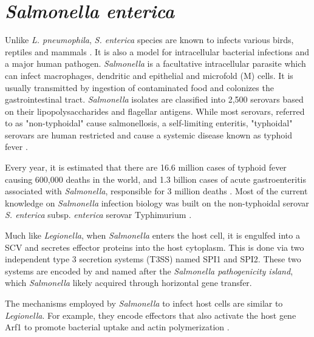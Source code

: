 \section{\textit{Salmonella enterica}}

Unlike \textit{L. pneumophila}, \textit{S. enterica} species are known to infects various birds, reptiles and mammals \cite{Uzzau2000}. It is also a model for intracellular bacterial infections and a major human pathogen. \textit{Salmonella} is a facultative intracellular parasite which can infect macrophages, dendritic and epithelial and microfold (M) cells. It is usually transmitted by ingestion of contaminated food and colonizes the gastrointestinal tract. \textit{Salmonella} isolates are classified into 2,500 serovars based on their lipopolysaccharides and flagellar antigens. While most serovars, referred to as "non-typhoidal" cause salmonellosis, a self-limiting enteritis, "typhoidal" serovars are human restricted and cause a systemic disease known as typhoid fever \cite{Larock2015}.

Every year, it is estimated that there are 16.6 million cases of typhoid fever causing 600,000 deaths in the world, and 1.3 billion cases of acute gastroenteritis associated with \textit{Salmonella}, responsible for 3 million deaths \cite{Pang1995}. Most of the current knowledge on \textit{Salmonella} infection biology was built on the non-typhoidal serovar \textit{S. enterica} subsp. \textit{enterica} serovar Typhimurium \cite{Larock2015}. 

Much like \textit{Legionella}, when \textit{Salmonella} enters the host cell, it is engulfed into a \acrfull{SCV}  and secretes effector proteins into the host cytoplasm. This is done via two independent type 3 secretion systems (T3SS) named SPI1 and SPI2. These two systems are encoded by and named after the \textit{Salmonella pathogenicity island}, which \textit{Salmonella} likely acquired through horizontal gene transfer.

The mechanisms employed by \textit{Salmonella} to infect host cells are similar to \textit{Legionella}. For example, they encode effectors that also activate the host gene Arf1 to promote bacterial uptake and actin polymerization \cite{Larock2015}.
